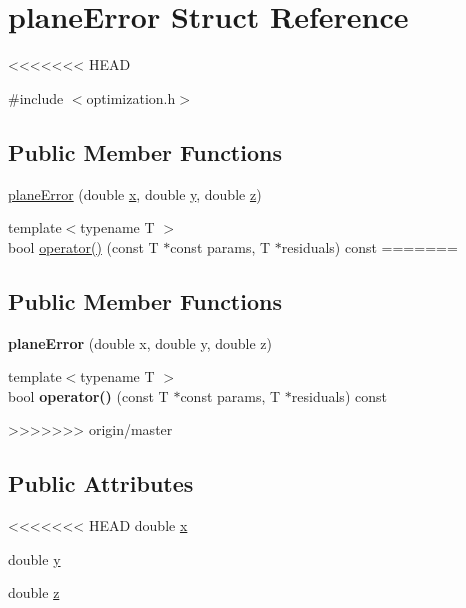 \hypertarget{structplaneError}{\section{plane\-Error Struct Reference}
\label{d5/d5f/structplaneError}
}
<<<<<<< HEAD


{\ttfamily \#include $<$optimization.\-h$>$}

\subsection*{Public Member Functions}
\begin{DoxyCompactItemize}
\item 
\hyperlink{structplaneError_a541059147fca58f0ae5a5f8250fa9c2e}{plane\-Error} (double \hyperlink{structplaneError_a0878fc75fe5f794fabb9aa2624a96628}{x}, double \hyperlink{structplaneError_a9a90e150b1afef11eb895f8f966915a7}{y}, double \hyperlink{structplaneError_a5e8aeb29ac5d70b0d24d908c6b8718ce}{z})
\item 
{\footnotesize template$<$typename T $>$ }\\bool \hyperlink{structplaneError_a3f89d8037cfd90b415e214e25d292e47}{operator()} (const T $\ast$const params, T $\ast$residuals) const 
=======
\subsection*{Public Member Functions}
\begin{DoxyCompactItemize}
\item 
\hypertarget{structplaneError_a541059147fca58f0ae5a5f8250fa9c2e}{{\bfseries plane\-Error} (double x, double y, double z)}\label{d5/d5f/structplaneError_a541059147fca58f0ae5a5f8250fa9c2e}

\item 
\hypertarget{structplaneError_a3f89d8037cfd90b415e214e25d292e47}{{\footnotesize template$<$typename T $>$ }\\bool {\bfseries operator()} (const T $\ast$const params, T $\ast$residuals) const }\label{d5/d5f/structplaneError_a3f89d8037cfd90b415e214e25d292e47}

>>>>>>> origin/master
\end{DoxyCompactItemize}
\subsection*{Public Attributes}
\begin{DoxyCompactItemize}
\item 
<<<<<<< HEAD
double \hyperlink{structplaneError_a0878fc75fe5f794fabb9aa2624a96628}{x}
\item 
double \hyperlink{structplaneError_a9a90e150b1afef11eb895f8f966915a7}{y}
\item 
double \hyperlink{structplaneError_a5e8aeb29ac5d70b0d24d908c6b8718ce}{z}
\end{DoxyCompactItemize}



\end{DoxyCompactItemize}
